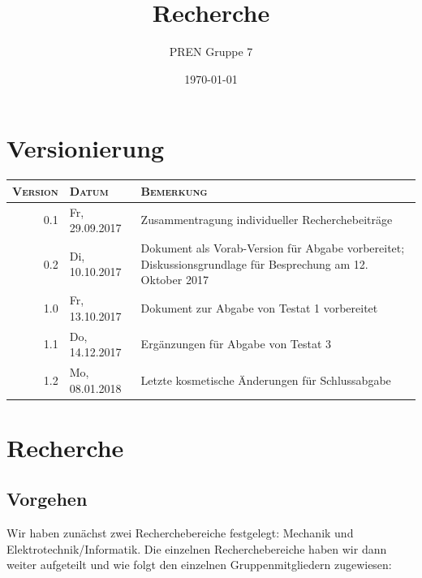 \documentclass[a4paper,11pt]{scrartcl}
\begin{document}
\author{PREN Gruppe 7}
\title{Recherche}
\date{\today}

\maketitle

\section*{Versionierung}

\def\arraystretch{1.2}
\begin{tabularx}{\textwidth}{|r|l|X|}
\hline
\textsc{Version} & \textsc{Datum} & \textsc{Bemerkung} \\
\hline
0.1 & Fr, 29.09.2017 & Zusammentragung individueller Recherchebeiträge \\
0.2 & Di, 10.10.2017 & Dokument als Vorab-Version für Abgabe vorbereitet; Diskussionsgrundlage für Besprechung am 12. Oktober 2017 \\
1.0 & Fr, 13.10.2017 & Dokument zur Abgabe von Testat 1 vorbereitet \\
1.1 & Do, 14.12.2017 & Ergänzungen für Abgabe von Testat 3 \\
1.2 & Mo, 08.01.2018 & Letzte kosmetische Änderungen für Schlussabgabe \\
\hline
\end{tabularx}

\newpage

\section{Recherche}

\subsection{Vorgehen}

Wir haben zunächst zwei Recherchebereiche festgelegt: Mechanik und Elektrotechnik/Informatik. Die einzelnen Recherchebereiche haben wir dann weiter aufgeteilt und wie folgt den einzelnen Gruppenmitgliedern zugewiesen:
\end{document}
